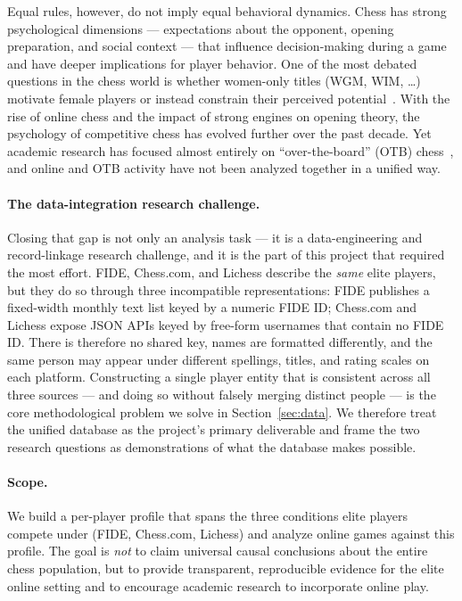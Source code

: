 \documentclass[11pt,a4paper]{article}
\begin{document}
Equal rules, however, do not imply equal behavioral dynamics. Chess has strong
psychological dimensions --- expectations about the opponent, opening preparation, and
social context --- that influence decision-making during a game and have deeper
implications for player behavior. One of the most debated questions in the chess world is
whether women-only titles (WGM, WIM, \dots) motivate female players or instead constrain
their perceived potential~\cite{maass2008checkmate}. With the rise of online chess and the
impact of strong engines on opening theory, the psychology of competitive chess has evolved
further over the past decade. Yet academic research has focused almost entirely on
``over-the-board'' (OTB) chess~\cite{bilalic2009why,blanch2017sex,backus2023gender}, and
online and OTB activity have not been analyzed together in a unified way.

\paragraph{The data-integration research challenge.}
Closing that gap is not only an analysis task --- it is a data-engineering and record-linkage
research challenge, and it is the part of this project that required the most effort. FIDE,
Chess.com, and Lichess describe the \emph{same} elite players, but they do so through three
incompatible representations: FIDE publishes a fixed-width monthly text list keyed by a
numeric FIDE ID; Chess.com and Lichess expose JSON APIs keyed by free-form usernames that
contain no FIDE ID. There is therefore no shared key, names are formatted differently, and
the same person may appear under different spellings, titles, and rating scales on each
platform. Constructing a single player entity that is consistent across all three sources ---
and doing so without falsely merging distinct people --- is the core methodological problem we
solve in Section~\ref{sec:data}. We therefore treat the unified database as the project's
primary deliverable and frame the two research questions as demonstrations of what the
database makes possible.

\paragraph{Scope.}
We build a per-player profile that spans the three conditions elite players compete under
(FIDE, Chess.com, Lichess) and analyze online games against this profile. The goal is
\emph{not} to claim universal causal conclusions about the entire chess population, but to
provide transparent, reproducible evidence for the elite online setting and to encourage
academic research to incorporate online play.
\end{document}
